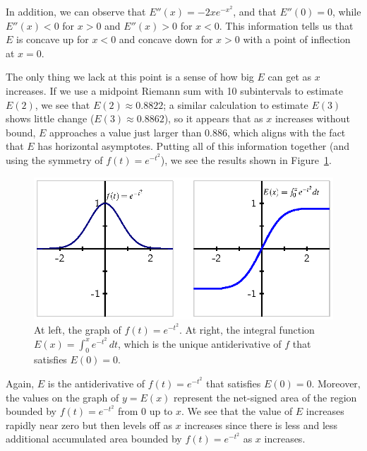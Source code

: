 In addition, we can observe that $E''(x) = -2xe^{-x^2}$, and that $E''(0) = 0$, while $E''(x) < 0$ for $x > 0$ and $E''(x) > 0$ for $x < 0$.  This information tells us that $E$ is concave up for $x<0$ and concave down for $x > 0$ with a point of inflection at $x = 0$.  

The only thing we lack at this point is a sense of how big $E$ can get as $x$ increases.  If we use a midpoint Riemann sum with 10 subintervals to estimate $E(2)$, we see that $E(2) \approx 0.8822$; a similar calculation to estimate $E(3)$ shows little change ($E(3) \approx 0.8862$), so it appears that as $x$ increases without bound, $E$ approaches a value just larger than $0.886$, which aligns with the fact that $E$ has horizontal asymptotes.  Putting all of this information together (and using the symmetry of $f(t) = e^{-t^2}$), we see the results shown in Figure~\ref{F:5.2.erf}.

\begin{figure}[h]
\begin{center}
\includegraphics{figures/5_2_erf.eps}
\end{center}
\caption{At left, the graph of $f(t) = e^{-t^2}$.  At right, the integral function $E(x) = \int_0^x e^{-t^2} \,dt$, which is the unique antiderivative of $f$ that satisfies $E(0) = 0$.} \label{F:5.2.erf}
\end{figure}

Again, $E$ is the antiderivative of $f(t) = e^{-t^2}$ that satisfies $E(0) = 0$.  Moreover, the values on the graph of $y = E(x)$ represent the net-signed area of the region bounded by $f(t) = e^{-t^2}$ from 0 up to $x$.  We see that the value of $E$ increases rapidly near zero but then levels off as $x$ increases since there is less and less additional accumulated area bounded by $f(t) = e^{-t^2}$ as $x$ increases.

\afterex



